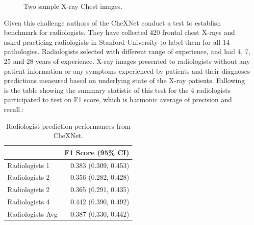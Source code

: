 \documentclass[12pt, twoside, a4paper]{article}
\begin{document}
\begin{figure}[H]%
    \centering
    \qquad
    \caption{Two sample X-ray Chest images.}%
    \label{fig:sample}%
\end{figure}
Given this challenge authors of the CheXNet conduct a test to establish benchmark for radiologists. They have collected 420 frontal chest X-rays and asked practicing radiologists in Stanford University to label them for all 14 pathologies. Radiologists selected with different range of experience, and had 4, 7, 25 and 28 years of experience. X-ray images presented to radiologists without any patient information or any symptoms experienced by patients and their diagnoses predictions measured based on underlying state of the X-ray patients. Fallowing is the table showing the summary statistic of this test for the 4 radiologists participated to test on F1 score, which is harmonic average of precision and recall.\cite{CheXNetRP}:
\begin{table}[h!]
    \centering
     \begin{tabular}{l r} 
     \hline
      & F1 Score (95\% CI) \\ [0.5ex] 
     \hline
     Radiologists 1 & 0.383 (0.309, 0.453) \\ 
     Radiologists 2 & 0.356 (0.282, 0.428) \\
     Radiologists 2 & 0.365 (0.291, 0.435) \\
     Radiologists 4 & 0.442 (0.390, 0.492) \\
     \hline
     Radiologists Avg & 0.387 (0.330, 0.442) \\ [1ex] 
     \hline
     \end{tabular}
     \caption{Radiologist prediction performances from CheXNet.}
     \label{table:radiologist}
    \end{table}
\end{document}
